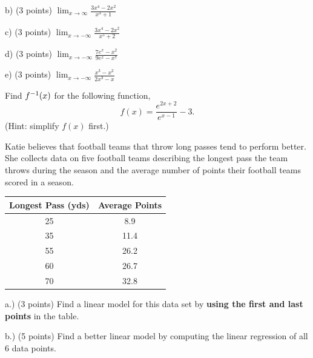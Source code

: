 \documentclass[11pt]{article}
\newcommand{\inv}{\ensuremath ^{-1}}
\begin{document}
\begin{questions}
\vspace{1.25in}

b) (3 points)  $\displaystyle \lim_{x\to\infty} \frac{3x^4 - 2x^2}{x^3 +1}$

\vspace{1.25in}

c)  (3 points)  $\displaystyle \lim_{x\to-\infty} \frac{3x^4 - 2x^2}{x^5 +2}$

\vspace{1.25in}

d) (3 points) $\displaystyle \lim_{x\to-\infty} \frac{7e^x - x^2}{9e^x -x^7}$

\vspace{1.25in}

e)  (3 points) $\displaystyle \lim_{x\to-\infty} \frac{x^3 - x^2}{2x^3 -x}$

\vspace{1.25in}


\question[10] Find $f\inv(x)$ for the following function,
\[f(x) = \frac{e^{2x+2}}{e^{x-1}} - 3.\]
(Hint: simplify $f(x)$ first.)
\vspace{3.25in}


\question[15] Katie believes that football teams that throw long passes tend to perform better.  She collects data on five football teams describing the longest pass the team throws during the season and the average number of points their football teams scored in a season.  \\
\begin{center}
  \begin{tabular}{| c | c |}
    \hline
    Longest Pass (yds) & Average Points \\ \hline \hline
    25 & 8.9  \\ \hline
    35 & 11.4  \\ \hline
    55 & 26.2  \\ \hline
    60 & 26.7  \\ \hline
    70 & 32.8  \\ \hline
  \end{tabular}
\end{center}

a.) (3 points) Find a linear model for this data set by \textbf{using the first and last points} in the table.
\vspace{1.5in}

b.) (5 points) Find a better linear model by computing the linear regression of all 6 data points.
\vspace{1in}



\end{questions}
\end{document}

